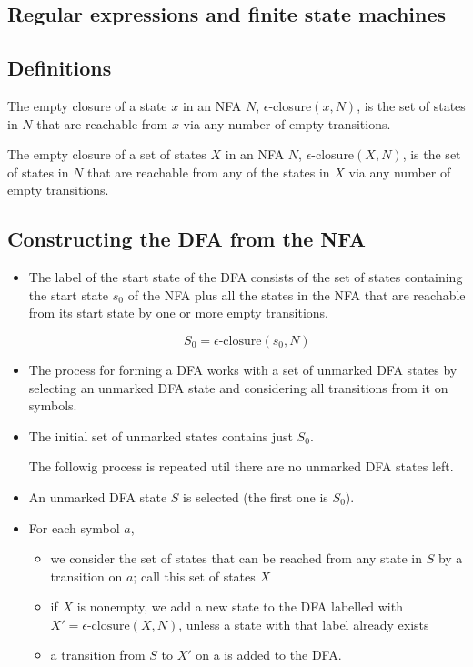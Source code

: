\documentclass[fontsize=10pt,a4paper]{article}
\begin{document}
\begin{multicols}{3}
    \section{Regular expressions and finite state machines}

    \subsection{Definitions}

    The empty closure of a state $x$ in an NFA $N$, $\epsilon$-closure$(x, N)$, is the set of states in $N$ that are reachable from $x$ via any number of empty transitions.

    The empty closure of a set of states $X$ in an NFA $N$, $\epsilon$-closure$(X, N)$, is the set of states in $N$ that are reachable from any of the states in $X$ via any number of empty transitions.

    \subsection{Constructing the DFA from the NFA}

    \begin{itemize}
        \item The label of the start state of the DFA consists of the set of states containing the start state $s_0$ of the NFA plus all the states in the NFA that are reachable from its start state by one or more empty transitions.

        \[S_0 = \epsilon\text{-closure}(s_0, N)\]

        \item The process for forming a DFA works with a set of unmarked DFA states by selecting an unmarked DFA state and considering all transitions from it on symbols.

        \item The initial set of unmarked states contains just $S_0$.

        The followig process is repeated util there are no unmarked DFA states left.

        \item An unmarked DFA state $S$ is selected (the first one is $S_0$).

        \item For each symbol $a$,

        \begin{itemize}
            \item we consider the set of states that can be reached from any state in $S$ by a transition on $a$; call this set of states $X$
            \item if $X$ is nonempty, we add a new state to the DFA labelled with $X' = \epsilon\text{-closure}(X, N)$, unless a state with that label already exists
            \item a transition from $S$ to $X'$ on a is added to the DFA.
        \end{itemize}


\end{itemize}
\end{multicols}
\end{document}
